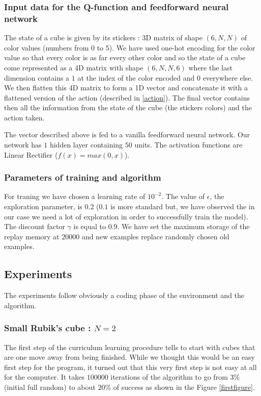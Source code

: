 \documentclass{article} %
\begin{document}
\subsubsection{Input data for the Q-function and feedforward neural network}
The state of a cube is given by its stickers : 3D matrix of shape $(6, N, N)$ of color values (numbers from $0$ to $5$). We have used one-hot encoding for the color value so that every color is as far every other color and so the state of a cube come represented as a 4D matrix with shape $(6, N, N, 6)$ where the last dimension contains a $1$ at the index of the color encoded and $0$ everywhere else. We then flatten this 4D matrix to form a 1D vector and concatenate it with a flattened version of the action (described in \ref{action}). The final vector contains then all the information from the state of the cube (the stickers colors) and the action taken.

The vector described above is fed to a vanilla feedforward neural network. Our network has $1$ hidden layer containing $50$ units. The activation functions are Linear Rectifier ($f(x) = max(0, x)$).

\subsubsection{Parameters of training and algorithm}
For traning we have chosen a learning rate of $10^{-2}$. The value of $\epsilon$, the exploration parameter, is $0.2$ ($0.1$ is more standard but, we have observed the in our case we need a lot of exploration in order to successfully train the model). The discount factor $\gamma$ is equal to $0.9$. We have set the maximum storage of the replay memory at $20000$ and new examples replace randomly chosen old examples.

\subsection{Experiments}
The experiments follow obviously a coding phase of the environment and the algorithm.

\subsubsection{Small Rubik's cube : $N=2$}
The first step of the curriculum learning procedure tells to start with cubes that are one move away from being finished. While we thought this would be an easy first step for the program, it turned out that this very first step is not easy at all for the computer. It takes $100000$ iterations of the algorithm to go from $3$\% (initial full random) to about $20$\% of success as shown in the Figure \ref{firstfigure}.
\end{document}
